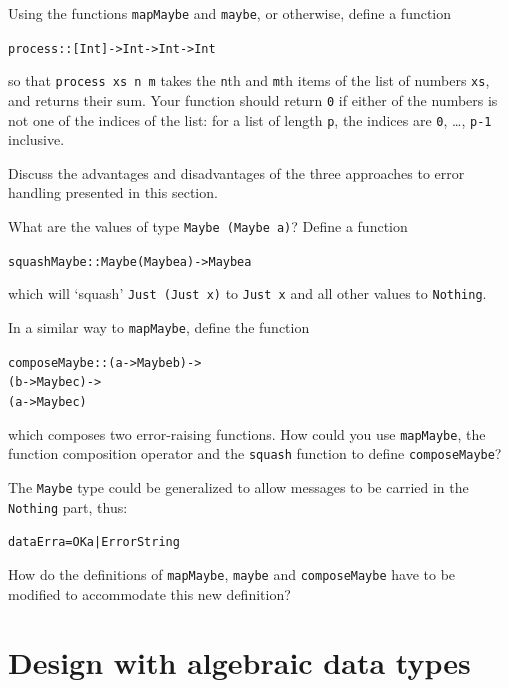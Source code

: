 \begin{exercises}

\item
Using the functions \texttt{mapMaybe} and \texttt{maybe}, or otherwise, define a function 
\begin{alltt}
process :: [Int] -> Int -> Int -> Int
\end{alltt}
so that \texttt{process xs n m} takes the \texttt{n}th and \texttt{m}th items of the list
of numbers \texttt{xs}, and returns their sum. Your function should return \texttt{0}
if either of the numbers is not one of the indices of the list:
for a list of length \texttt{p}, the indices are \texttt{0}, \ldots, 
\texttt{p-1} inclusive.

\item
Discuss the advantages and disadvantages of the three approaches to error
handling presented in this section.

\item
What are the values of type \texttt{Maybe (Maybe a)}?
Define a function
\begin{alltt}
squashMaybe :: Maybe (Maybe a) -> Maybe a
\end{alltt}
which will `squash' \texttt{Just (Just x)} to \texttt{Just x} and all other values to
\texttt{Nothing}.

\item
In a similar way to \texttt{mapMaybe}, define the function
\begin{alltt}
composeMaybe :: (a -> Maybe b) -> 
                (b -> Maybe c) -> 
                (a -> Maybe c)
\end{alltt}
which composes two error-raising functions. How could you use \texttt{mapMaybe}, the
function composition operator
and the \texttt{squash} function to define \texttt{composeMaybe}?

\item
The \texttt{Maybe} type could be generalized to allow messages to be carried in the
\texttt{Nothing} part, thus: 
\begin{alltt}
data Err a = OK a | Error String
\end{alltt}
How do the definitions of \texttt{mapMaybe}, \texttt{maybe} and \texttt{composeMaybe} have to
be modified to accommodate this new definition?
\end{exercises}
\section{Design with algebraic data types}
\label{algDesign}

